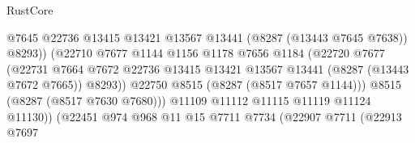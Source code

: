 \begin{lexlean}{RustCore}
\begin{coremodule}
                                                @7645
                                                @22736
                                                @13415
                                                @13421
                                                @13567
                                                @13441
                                                (@8287 (@13443 @7645 @7638))
                                                @8293))
                                            (@22710
                                              @7677
                                              @1144
                                              @1156
                                              @1178
                                              @7656
                                              @1184
                                              (@22720
                                                @7677
                                                (@22731
                                                  @7664
                                                  @7672
                                                  @22736
                                                  @13415
                                                  @13421
                                                  @13567
                                                  @13441
                                                  (@8287 (@13443 @7672 @7665))
                                                  @8293))
                                              @22750
                                              @8515
                                              (@8287 (@8517 @7657 @1144)))
                                            @8515
                                            (@8287 (@8517 @7630 @7680)))
                                          @11109
                                          @11112
                                          @11115
                                          @11119
                                          @11124
                                          @11130))
                                      (@22451
                                        @974
                                        @968
                                        @11
                                        @15
                                        @7711
                                        @7734
                                        (@22907
                                          @7711
                                          (@22913
                                            @7697

\end{coremodule}
\end{lexlean}
